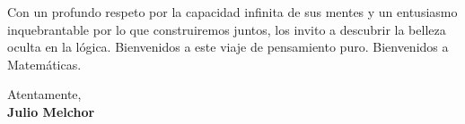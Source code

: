 \documentclass[11pt]{report}
\begin{document}
\begin{titlepage}
\vspace{0.7em}

Con un profundo respeto por la capacidad infinita de sus mentes y un entusiasmo inquebrantable por lo que construiremos juntos, los invito a descubrir la belleza oculta en la lógica. Bienvenidos a este viaje de pensamiento puro. Bienvenidos a Matemáticas.

\vspace{0.7em}

\raggedright Atentamente,\\
\textbf{Julio Melchor}

\end{titlepage}
\end{document}
